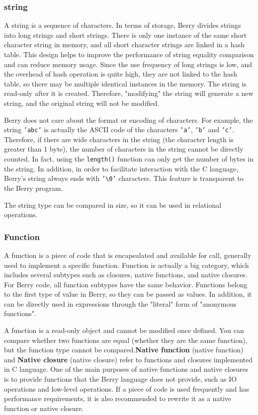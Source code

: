 \subsubsection {string}

A string is a sequence of characters. In terms of storage, Berry divides strings into long strings and short strings. There is only one instance of the same short character string in memory, and all short character strings are linked in a hash table. This design helps to improve the performance of string equality comparison and can reduce memory usage. Since the use frequency of long strings is low, and the overhead of hash operation is quite high, they are not linked to the hash table, so there may be multiple identical instances in the memory. The string is read-only after it is created. Therefore, "modifying" the string will generate a new string, and the original string will not be modified.

Berry does not care about the format or encoding of characters. For example, the string \texttt{'abc'} is actually the ASCII code of the characters \texttt{'a'}, \texttt{'b'} and \texttt{'c'}. Therefore, if there are wide characters in the string (the character length is greater than 1 byte), the number of characters in the string cannot be directly counted. In fact, using the \texttt{length()} function can only get the number of bytes in the string. In addition, in order to facilitate interaction with the C language, Berry's string always ends with \texttt{'\textbackslash 0'} characters. This feature is transparent to the Berry program.

The string type can be compared in size, so it can be used in relational operations.

\subsubsection {Function}

A function is a piece of code that is encapsulated and available for call, generally used to implement a specific function. Function is actually a big category, which includes several subtypes such as closures, native functions, and native closures. For Berry code, all function subtypes have the same behavior. Functions belong to the first type of value in Berry, so they can be passed as values. In addition, it can be directly used in expressions through the "literal" form of "anonymous functions".

A function is a read-only object and cannot be modified once defined. You can compare whether two functions are equal (whether they are the same function), but the function type cannot be compared.\textbf{Native function} (native function) and \textbf{Native closure} (native closure) refer to functions and closures implemented in C language. One of the main purposes of native functions and native closures is to provide functions that the Berry language does not provide, such as IO operations and low-level operations. If a piece of code is used frequently and has performance requirements, it is also recommended to rewrite it as a native function or native closure.

